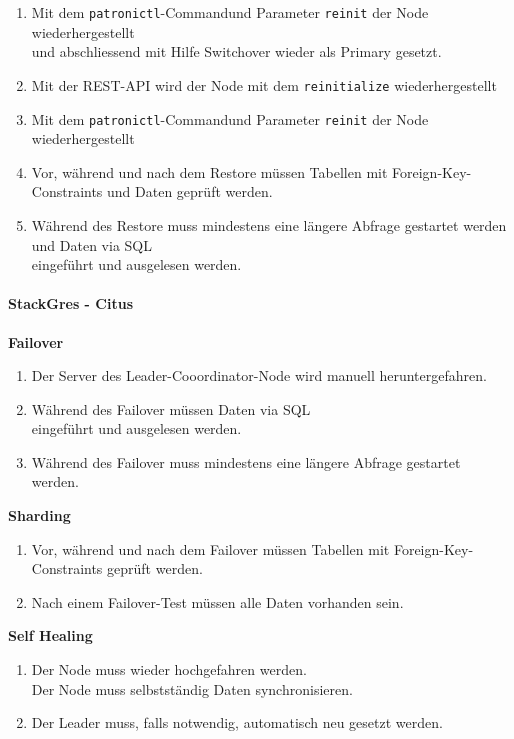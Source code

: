 \begin{flushleft}
\begin{description}
\begin{enumerate}[resume]
            \item Mit dem \texttt{patronictl}-Commandund Parameter \texttt{reinit} der Node wiederhergestellt\\und abschliessend mit Hilfe Switchover wieder als Primary gesetzt.
            \item Mit der REST-API wird der Node mit dem \texttt{reinitialize} wiederhergestellt
            \item Mit dem \texttt{patronictl}-Commandund Parameter \texttt{reinit} der Node wiederhergestellt
            \item Vor, während und nach dem Restore müssen Tabellen mit Foreign-Key-Constraints und Daten geprüft werden.
            \item Während des Restore muss mindestens eine längere Abfrage gestartet werden und Daten via SQL\\eingeführt und ausgelesen werden.
        \end{enumerate}
    \end{description}
    \clearpage
    \paragraph{StackGres - Citus}
    \begin{description}
        \item \textbf{Failover}\hfill \\
        \begin{enumerate}
            \item Der Server des Leader-Cooordinator-Node wird manuell heruntergefahren.
            \item Während des Failover müssen Daten via SQL\\eingeführt und ausgelesen werden.
            \item Während des Failover muss mindestens eine längere Abfrage gestartet werden.
        \end{enumerate}
        \item \textbf{Sharding}\hfill \\
        \begin{enumerate}[resume]
            \item Vor, während und nach dem Failover müssen Tabellen mit Foreign-Key-Constraints geprüft werden.
            \item Nach einem Failover-Test müssen alle Daten vorhanden sein.
        \end{enumerate}
        \item \textbf{Self Healing}\hfill \\
        \begin{enumerate}[resume]
            \item Der Node muss wieder hochgefahren werden.\\Der Node muss selbstständig Daten synchronisieren.
            \item Der Leader muss, falls notwendig, automatisch neu gesetzt werden.
        \end{enumerate}
    \end{description}

\end{flushleft}
